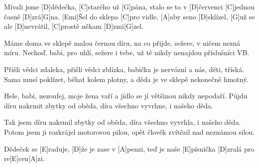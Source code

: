 
\sloka
[G]Mívali jsme [D]dědečka, [C]starého už [G]pána,
stalo se to v [D]červenci [C]jednou časně [D]zrá[G]na.
[Emi]Šel do sklepa [C]pro vidle, [A]aby seno [D]sklízel,
[G]už se ale [D]nevrátil, [C]prostě někam [D]zmi[G]zel.

\sloka
Máme doma ve sklepě malou černou díru,
na co přijde, sežere, v ničem nezná míru.
Nechoď, babi, pro uhlí, sežere i tebe,
už tě nikdy nenajdou příslušníci VB.

\sloka
Přišli vědci zdaleka, přišli vědci zblízka,
babička je nervózní a nás, děti, tříská.
Sama musí poklízet, běhat kolem plotny,
a děda je ve sklepě nekonečně hmotný.

\sloka
Hele, babi, nezoufej, moje žena vaří
a jídlo se jí většinou nikdy nepodaří.
Půjdu díru nakrmit zbytky od oběda,
díra všechno vyvrhne, i našeho děda.

\sloka
Tak jsem díru nakrmil zbytky od oběda,
díra všechno vyvrhla, i našeho děda.
Potom jsem ji rozkrájel motorovou pilou,
opět člověk zvítězil nad neznámou silou.

\hvezda
[A]Dědeček se [E]raduje, [D]že je zase v [A]penzi,
teď je naše [E]písnička [D]zralá pro re[E]cen[A]zi.
